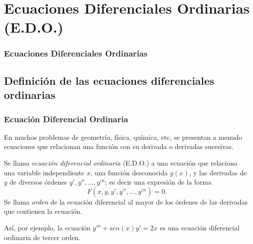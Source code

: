 

\section{Ecuaciones Diferenciales Ordinarias (E.D.O.)}
\begin{frame}
\frametitle{Ecuaciones Diferenciales Ordinarias}
\tableofcontents[sectionstyle=show/hide,hideothersubsections]
\end{frame}



\subsection{Definición de las ecuaciones diferenciales ordinarias}
\begin{frame}
\frametitle{Ecuación Diferencial Ordinaria}
En muchos problemas de geometría, física, química, etc, se presentan a menudo ecuaciones que relacionan una función con su derivada o derivadas sucesivas.

\begin{definicion}
Se llama \emph{ecuación diferencial ordinaria} (E.D.O.) a una ecuación que relaciona
una variable independiente $x$, una función desconocida $y(x)$, y las derivadas de $y$ de diversos órdenes $y',y'',\ldots,y^{(n}$; es decir una expresión de la forma
\[
F(x, y, y', y'',\ldots, y^{(n})=0.
\] 
Se llama \emph{orden} de la ecuación diferencial al mayor de los órdenes de las derivadas que contienen la ecuación.
\end{definicion}
Así, por ejemplo, la ecuación $y'''+sen(x)y'=2x$ es una ecuación diferencial ordinaria de tercer orden.
\end{frame}


